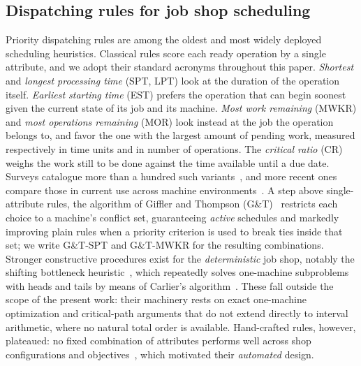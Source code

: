 \documentclass[review,authoryear,11pt]{elsarticle}
\begin{document}
\subsection{Dispatching rules for job shop scheduling}
Priority dispatching rules are among the oldest and most widely
deployed scheduling heuristics. Classical rules
score each ready operation by a single attribute, and we adopt their
standard acronyms throughout this paper. \emph{Shortest} and
\emph{longest processing time} (SPT, LPT) look at the duration of the
operation itself. \emph{Earliest starting time} (EST) prefers the
operation that can begin soonest given the current state of its job and
its machine. \emph{Most work remaining} (MWKR) and \emph{most operations
remaining} (MOR) look instead at the job the operation belongs to, and
favor the one with the largest amount of pending work, measured
respectively in time units and in number of operations. The
\emph{critical ratio} (CR) weighs the work still to be done against the
time available until a due date. Surveys catalogue more than a hundred
such variants~\citep{Panwalkar1977,Haupt1989}, and more recent ones
compare those in current use across machine
environments~\citep{Durasevic2018}. A step
above single-attribute rules, the algorithm of Giffler and
Thompson (G\&T)~\citep{Giffler1960} restricts each choice to a machine's
conflict set, guaranteeing \emph{active} schedules and markedly
improving plain rules when a priority criterion is used to break ties
inside that set; we write G\&T-SPT and G\&T-MWKR for the resulting
combinations. Stronger constructive procedures exist
for the \emph{deterministic} job shop, notably the shifting bottleneck
heuristic~\citep{Adams1988}, which repeatedly solves one-machine
subproblems with heads and tails by means of Carlier's
algorithm~\citep{Carlier1982}. These fall outside the scope of the present work: their machinery rests
on exact one-machine optimization and critical-path arguments that do
not extend directly to interval arithmetic, where no natural total order
is available. Hand-crafted rules, however, plateaued: no fixed combination of
attributes performs well across shop configurations and
objectives~\citep{Haupt1989}, which motivated their \emph{automated}
design.
\end{document}
